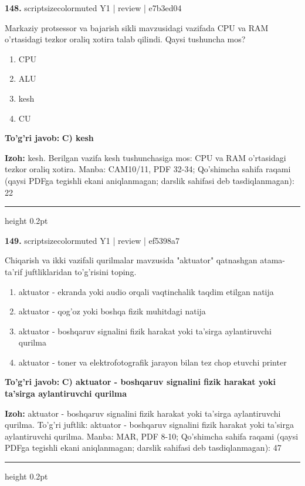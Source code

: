 \documentclass[10pt,a4paper]{article}
\begin{document}
{\bfseries\sffamily\color{ink} 148.} {scriptsizecolor{muted} Y1 | review | e7b3ed04}
\par
Markaziy protsessor va bajarish sikli mavzusidagi vazifada CPU va RAM o'rtasidagi tezkor oraliq xotira talab qilindi. Qaysi tushuncha mos?
\begin{enumerate}[label=\Alph*),leftmargin=9mm]
\item CPU
\item ALU
\item kesh
\item CU
\end{enumerate}
\begin{tcolorbox}[enhanced,breakable,colback=teal!4,colframe=teal!60!black,boxrule=0.45pt,arc=1.2mm,left=2.7mm,right=2.7mm,top=1.8mm,bottom=1.8mm,before skip=2mm,after skip=2mm]
{\bfseries\sffamily\color{teal}To'g'ri javob:} \textbf{C) kesh}
\par\smallskip
{\bfseries Izoh:} kesh. Berilgan vazifa kesh tushunchasiga mos: CPU va RAM o'rtasidagi tezkor oraliq xotira. Manba: CAM10/11, PDF 32-34; Qo'shimcha sahifa raqami (qaysi PDFga tegishli ekani aniqlanmagan; darslik sahifasi deb tasdiqlanmagan): 22
\end{tcolorbox}
\vspace{2mm}\hrule height 0.2pt\vspace{3mm}

{\bfseries\sffamily\color{ink} 149.} {scriptsizecolor{muted} Y1 | review | ef5398a7}
\par
Chiqarish va ikki vazifali qurilmalar mavzusida "aktuator" qatnashgan atama-ta'rif juftliklaridan to'g'risini toping.
\begin{enumerate}[label=\Alph*),leftmargin=9mm]
\item aktuator - ekranda yoki audio orqali vaqtinchalik taqdim etilgan natija
\item aktuator - qog'oz yoki boshqa fizik muhitdagi natija
\item aktuator - boshqaruv signalini fizik harakat yoki ta'sirga aylantiruvchi qurilma
\item aktuator - toner va elektrofotografik jarayon bilan tez chop etuvchi printer
\end{enumerate}
\begin{tcolorbox}[enhanced,breakable,colback=teal!4,colframe=teal!60!black,boxrule=0.45pt,arc=1.2mm,left=2.7mm,right=2.7mm,top=1.8mm,bottom=1.8mm,before skip=2mm,after skip=2mm]
{\bfseries\sffamily\color{teal}To'g'ri javob:} \textbf{C) aktuator - boshqaruv signalini fizik harakat yoki ta'sirga aylantiruvchi qurilma}
\par\smallskip
{\bfseries Izoh:} aktuator - boshqaruv signalini fizik harakat yoki ta'sirga aylantiruvchi qurilma. To'g'ri juftlik: aktuator - boshqaruv signalini fizik harakat yoki ta'sirga aylantiruvchi qurilma. Manba: MAR, PDF 8-10; Qo'shimcha sahifa raqami (qaysi PDFga tegishli ekani aniqlanmagan; darslik sahifasi deb tasdiqlanmagan): 47
\end{tcolorbox}
\vspace{2mm}\hrule height 0.2pt\vspace{3mm}
\end{document}
